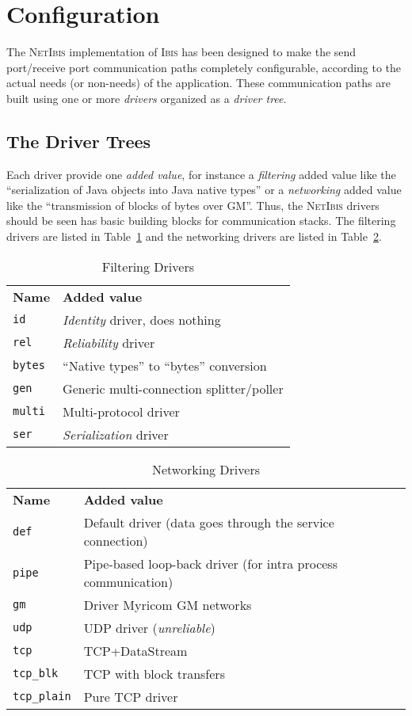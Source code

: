 \documentclass[11pt]{book}
\def\sep{\\[0.5ex]}
\def\Ibis{\textsc{Ibis}\xspace}
\def\NetIbis{\textsc{NetIbis}\xspace}
\begin{document}
\section{Configuration}
\label{sec:configuration}

The \NetIbis implementation of \Ibis has been designed to make the
send port/receive port communication paths completely configurable,
according to the actual needs (or non-needs) of the application. These
communication paths are built using one or more \textit{drivers}
organized as a \textit{driver tree}.

\subsection{The Driver Trees}
\label{sec:driver-trees}

Each driver provide one \textit{added value}, for instance a
\textit{filtering} added value like the ``serialization of Java
objects into Java native types'' or a \textit{networking} added value
like the ``transmission of blocks of bytes over GM''. Thus, the
\NetIbis drivers should be seen has basic building blocks for
communication stacks. The filtering drivers are listed in
Table~\ref{tab:filter-drivers} and the networking drivers are listed
in Table~\ref{tab:net-drivers}.

\begin{table}[htbp]
  \centering
  \begin{tabular}{p{2cm}p{10cm}}
    \hline
    \textbf{Name}    & \textbf{Added value} \sep
    \texttt{id}      & \textit{Identity} driver, does nothing\\
    \texttt{rel}     & \textit{Reliability} driver\\
    \texttt{bytes}   & ``Native types'' to ``bytes'' conversion\sep
    \texttt{gen}     & Generic multi-connection splitter/poller\\
    \texttt{multi}   & Multi-protocol driver\sep
    \texttt{ser}     & \textit{Serialization} driver\\
    \hline
  \end{tabular}
  \caption{Filtering Drivers}
  \label{tab:filter-drivers}
\end{table}

\begin{table}[htbp]
  \centering
  \begin{tabular}{p{2cm}p{10cm}}
    \hline
    \textbf{Name}    & \textbf{Added value} \sep
    \texttt{def}        & Default driver (data goes through the service connection)\sep
    \texttt{pipe}       & Pipe-based loop-back driver (for intra process communication)\\
    \texttt{gm}         & Driver Myricom GM networks\\
    \texttt{udp}        & UDP driver (\emph{unreliable}) \sep
    \texttt{tcp}        & TCP+DataStream\\
    \texttt{tcp\_blk}   & TCP with block transfers\\
    \texttt{tcp\_plain} & Pure TCP driver\\
    \hline
  \end{tabular}
  \caption{Networking Drivers}
  \label{tab:net-drivers}
\end{table}
\end{document}
